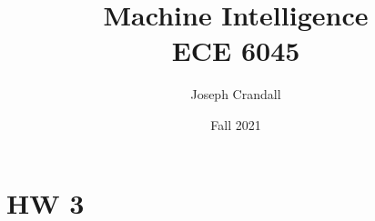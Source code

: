 
\usepackage{algorithm, algpseudocode, color, gensymb, siunitx, soul, subfiles}
\usepackage[a4paper, total={7.5in, 10in}]{geometry}

\title{Machine Intelligence\\
\large ECE 6045}
\author{Joseph Crandall}
\date{Fall 2021}


\maketitle

%

%

%

\section{HW 3}


%


